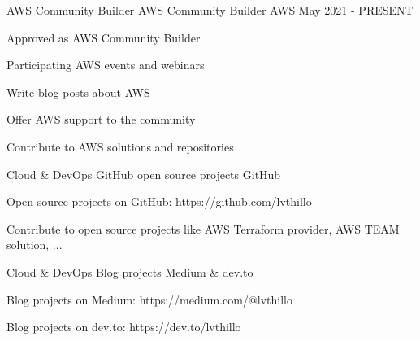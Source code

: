 \newpage
{}


\begin{cventries}

  \cventry
    {AWS Community Builder} %
    {AWS Community Builder} %
    {AWS} %
    {May 2021 - PRESENT} %
    {
      \begin{cvitems} %
        \item {Approved as AWS Community Builder}
        \item {Participating AWS events and webinars}
        \item {Write blog posts about AWS}
        \item {Offer AWS support to the community}
        \item {Contribute to AWS solutions and repositories}
      \end{cvitems}
    }

  \cventry
    {Cloud \& DevOps} %
    {GitHub open source projects} %
    {GitHub} %
    {} %
    {
      \begin{cvitems} %
        \item {Open source projects on GitHub: https://github.com/lvthillo} 
        \item {Contribute to open source projects like AWS Terraform provider, AWS TEAM solution, ...}
      \end{cvitems}
    }

  \cventry
    {Cloud \& DevOps} %
    {Blog projects} %
    {Medium \& dev.to} %
    {} %
    {
      \begin{cvitems} %
        \item {Blog projects on Medium: https://medium.com/@lvthillo}
        \item {Blog projects on dev.to: https://dev.to/lvthillo}
      \end{cvitems}
    }


\end{cventries}
